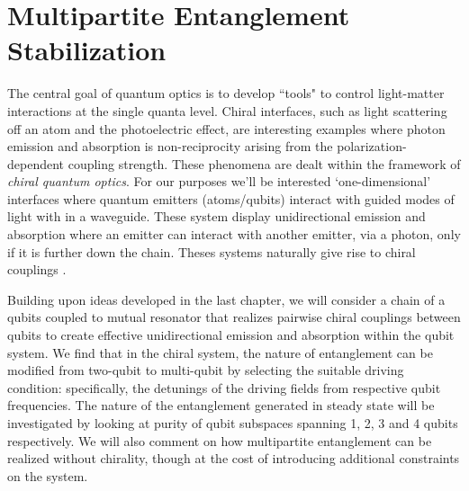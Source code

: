 \chapter{Multipartite Entanglement Stabilization}
%
The central goal of quantum optics is to develop ``tools" to control light-matter interactions at the single quanta level. Chiral interfaces, such as light scattering off an atom and the photoelectric effect, are interesting examples where photon emission and absorption is non-reciprocity arising from the polarization-dependent coupling strength. These phenomena are dealt within the framework of \textit{chiral quantum optics}. For our purposes we'll be interested `one-dimensional' interfaces where quantum emitters (atoms/qubits) interact with guided modes of light with in a waveguide. These system display unidirectional emission and absorption where an emitter can interact with another emitter, via a photon, only if it is further down the chain.  Theses systems naturally give rise to chiral couplings \cite{Chiral_Quantum_Optics,Chiral_QO_of_Spin_Chains}. 

Building upon ideas developed in the last chapter, we will consider a chain of a qubits coupled to mutual resonator that realizes pairwise chiral couplings between qubits to create effective unidirectional emission and absorption within the qubit system. We find that in the chiral system, the nature of entanglement can be modified from two-qubit to multi-qubit by selecting the suitable driving condition: specifically, the detunings of the driving fields from respective qubit frequencies. The nature of the entanglement generated in steady state will be investigated by looking at purity of qubit subspaces spanning 1, 2, 3 and 4 qubits respectively. We will also comment on how  multipartite entanglement can be realized without chirality, though at the cost of introducing additional constraints on the system.



